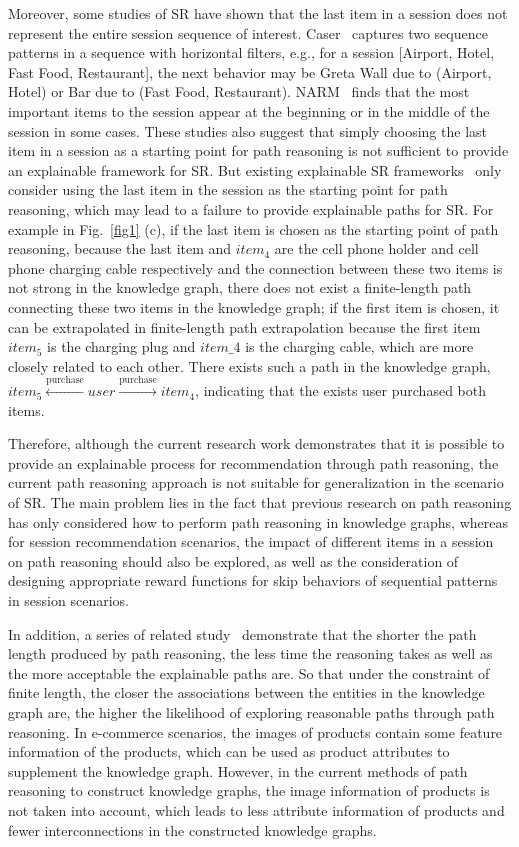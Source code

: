 \documentclass[10pt,journal,compsoc]{IEEEtran}
\begin{document}
Moreover, some studies of SR have shown that the last item in a session does not represent the entire session sequence of interest. Caser~\cite{rs_caser} captures two sequence patterns in a sequence with horizontal filters, e.g., for a session [Airport, Hotel, Fast Food, Restaurant], the next behavior may be Greta Wall due to (Airport, Hotel) or Bar due to (Fast Food, Restaurant). NARM~\cite{rs_narm} finds that the most important items to the session appear at the beginning or in the middle of the session in some cases. These studies also suggest that simply choosing the last item in a session as a starting point for path reasoning is not sufficient to provide an explainable framework for SR. But existing explainable SR frameworks~\cite{rs_reks} only consider using the last item in the session as the starting point for path reasoning, which may lead to a failure to provide explainable paths for SR. For example in Fig.~\ref{fig1} (c),  if the last item is chosen as the starting point of path reasoning, because the last item and $item_4$ are the cell phone holder and cell phone charging cable respectively and the connection between these two items is not strong in the knowledge graph, there does not exist a finite-length path connecting these two items in the knowledge graph; if the first item is chosen, it can be extrapolated in finite-length path extrapolation because the first item $item_5$ is the charging plug and $item\_4$ is the charging cable, which are more closely related to each other. There exists such a path in the knowledge graph, $ item_5 \xleftarrow{\text{purchase}} user \xrightarrow{\text{purchase}} item_4 $, indicating that the exists user purchased both items.

Therefore, although the current research work demonstrates that it is possible to provide an explainable process for recommendation through path reasoning, the current path reasoning approach is not suitable for generalization in the scenario of SR. 
The main problem lies in the fact that previous research on path reasoning has only considered how to perform path reasoning in knowledge graphs, whereas for session recommendation scenarios, the impact of different items in a session on path reasoning should also be explored, as well as the consideration of designing appropriate reward functions for skip behaviors of sequential patterns in session scenarios.

In addition, a series of related study~\cite{rl_pgpr,rl_adac} demonstrate that the shorter the path length produced by path reasoning, the less time the reasoning takes as well as the more acceptable the explainable paths are. So that under the constraint of finite length, the closer the associations between the entities in the knowledge graph are, the higher the likelihood of exploring reasonable paths through path reasoning. In e-commerce scenarios, the images of products contain some feature information of the products, which can be used as product attributes to supplement the knowledge graph. However, in the current methods of path reasoning to construct knowledge graphs, the image information of products is not taken into account, which leads to less attribute information of products and fewer interconnections in the constructed knowledge graphs.
\end{document}
